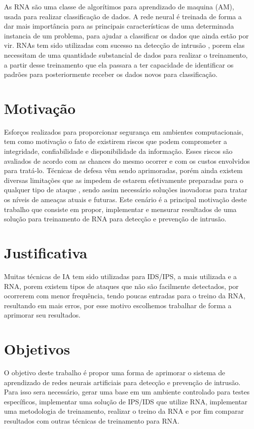 \documentclass[
	12pt,				%
	openright,			%
	oneside,
	a4paper,			%
	english,			%
	french,				%
	spanish,			%
	brazil				%
	]{abntex2}
\begin{document}
As RNA são uma classe de algorítimos para aprendizado de maquina (AM), usada para realizar classificação de dados. A rede neural é treinada de forma a dar mais importância para as principais características de uma determinada instancia de um problema, para ajudar a classificar os dados que ainda estão por vir. 
RNAs tem sido utilizadas com sucesso na detecção de intrusão \cite{Zhang} \cite{Tong} \cite{Wonil}, porem elas necessitam de uma quantidade substancial de dados para realizar o treinamento, a partir desse treinamento que ela passara a ter capacidade de identificar os padrões para posteriormente receber os dados novos para classificação.


\section{Motivação}

Esforços realizados para proporcionar segurança em ambientes computacionais, tem como motivação o fato de existirem riscos que podem comprometer a integridade, confiabilidade e disponibilidade da informação. 
Esses riscos são avaliados de acordo com as chances do mesmo ocorrer e com os custos envolvidos para tratá-lo. Técnicas de defesa vêm sendo aprimoradas, porém ainda existem diversas limitações que as impedem de estarem efetivamente preparadas para o qualquer tipo de ataque \cite{CeC}, sendo assim necessário  soluções inovadoras para tratar os níveis de ameaças atuais e futuras. 
Este cenário é a principal motivação deste trabalho que consiste em propor, implementar e mensurar resultados de uma solução para treinamento de RNA para detecção e prevenção de intrusão.

\section{Justificativa}

Muitas técnicas de IA tem sido utilizadas para IDS/IPS, a mais utilizada e a RNA\cite{Stampar}, porem existem tipos de ataques que não são facilmente detectados, por ocorrerem com menor frequência, tendo poucas entradas para o treino da RNA\cite{CeC}, resultando em mais erros,  por esse motivo escolhemos trabalhar de forma a aprimorar seu resultados. 


\section{Objetivos}

O objetivo deste trabalho é propor uma forma de aprimorar o sistema de aprendizado de redes neurais artificiais para detecção e prevenção de intrusão. 
Para isso sera necessário, gerar uma base em um ambiente controlado para testes específicos, implementar uma solução de IPS/IDS que utilize RNA, implementar uma metodologia de treinamento, realizar o treino da RNA e por fim comparar resultados com outras técnicas de treinamento para RNA.
\end{document}
